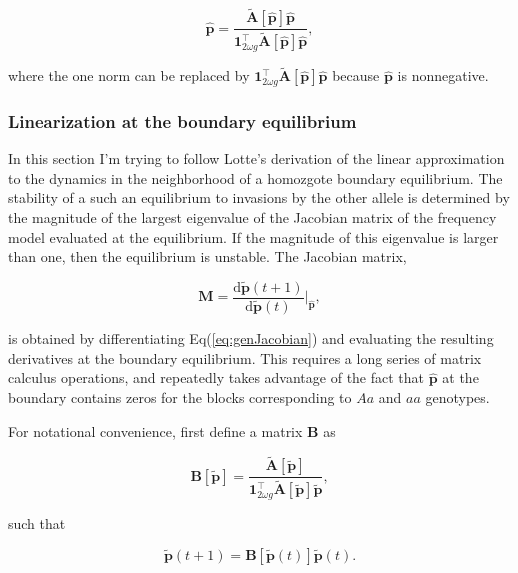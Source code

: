 \documentclass[11pt]{article}
\def\mbf#1{\mathbf{#1}}
\begin{document}
\begin{equation} 
	\hat{\mbf{p}} = \frac{ \tilde{\mbf{A}}[\hat{\mbf{p}}] \hat{\mbf{p}} }{ \mbf{1}^{\intercal}_{2 \omega g} \tilde{\mbf{A}}[\hat{\mbf{p}}] \hat{\mbf{p}} },
\end{equation}

\noindent where the one norm can be replaced by $\mbf{1}^{\intercal}_{2 \omega g} \tilde{\mbf{A}}[\hat{\mbf{p}}] \hat{\mbf{p}}$ because $\hat{\mbf{p}}$ is nonnegative.


\subsubsection*{Linearization at the boundary equilibrium}

In this section I'm trying to follow Lotte's derivation of the linear approximation to the dynamics in the neighborhood of a homozgote boundary equilibrium. The stability of a such an equilibrium to invasions by the other allele is determined by the magnitude of the largest eigenvalue of the Jacobian matrix of the frequency model evaluated at the equilibrium. If the magnitude of this eigenvalue is larger than one, then the equilibrium is unstable. The Jacobian matrix,

\begin{equation} \label{eq:genJacobian}
	\mbf{M} =  \frac{ \text{d} \tilde{\mbf{p}}(t + 1) }{ \text{d} \tilde{\mbf{p}}(t) } \bigg\rvert_{\hat{\mbf{p}}},
\end{equation}

\noindent is obtained by differentiating Eq(\ref{eq:genJacobian}) and evaluating the resulting derivatives at the boundary equilibrium. This requires a long series of matrix calculus operations, and repeatedly takes advantage of the fact that $\hat{\mbf{p}}$ at the boundary contains zeros for the blocks corresponding to $Aa$ and $aa$ genotypes.

For notational convenience, first define a matrix $\mbf{B}$ as

\begin{equation}
	\mbf{B}[\tilde{\mbf{p}}] = \frac{ \tilde{\mbf{A}}[\tilde{\mbf{p}}] }{ \mbf{1}^{\intercal}_{2 \omega g} \tilde{\mbf{A}}[\tilde{\mbf{p}}] \tilde{\mbf{p}}},
\end{equation}

\noindent such that 

\begin{equation} 
	\tilde{\mbf{p}}(t + 1) = \mbf{B}[\tilde{\mbf{p}}(t)]\tilde{\mbf{p}}(t).
\end{equation}
\end{document}
